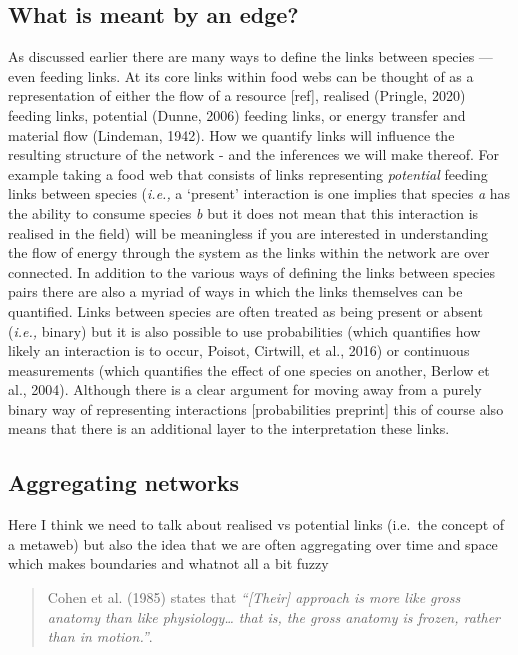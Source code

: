 \documentclass[
]{article}
\begin{document}
\subsection{What is meant by an edge?}\label{what-is-meant-by-an-edge}

As discussed earlier there are many ways to define the links between
species --- even feeding links. At its core links within food webs can
be thought of as a representation of either the flow of a resource
{[}ref{]}, realised (Pringle, 2020) feeding links, potential (Dunne,
2006) feeding links, or energy transfer and material flow (Lindeman,
1942). How we quantify links will influence the resulting structure of
the network - and the inferences we will make thereof. For example
taking a food web that consists of links representing \emph{potential}
feeding links between species (\emph{i.e.,} a `present' interaction is
one implies that species \emph{a} has the ability to consume species
\emph{b} but it does not mean that this interaction is realised in the
field) will be meaningless if you are interested in understanding the
flow of energy through the system as the links within the network are
over connected. In addition to the various ways of defining the links
between species pairs there are also a myriad of ways in which the links
themselves can be quantified. Links between species are often treated as
being present or absent (\emph{i.e.,} binary) but it is also possible to
use probabilities (which quantifies how likely an interaction is to
occur, Poisot, Cirtwill, et al., 2016) or continuous measurements (which
quantifies the effect of one species on another, Berlow et al., 2004).
Although there is a clear argument for moving away from a purely binary
way of representing interactions {[}probabilities preprint{]} this of
course also means that there is an additional layer to the
interpretation these links.

\subsection{Aggregating networks}\label{aggregating-networks}

Here I think we need to talk about realised vs potential links (i.e.~the
concept of a metaweb) but also the idea that we are often aggregating
over time and space which makes boundaries and whatnot all a bit fuzzy

\begin{quote}
Cohen et al. (1985) states that \emph{``{[}Their{]} approach is more
like gross anatomy than like physiology\ldots{} that is, the gross
anatomy is frozen, rather than in motion.''}.
\end{quote}
\end{document}
